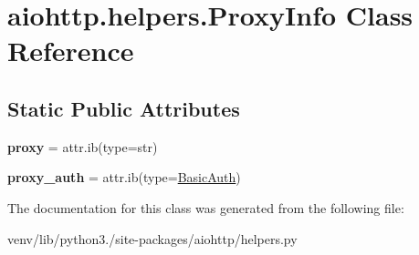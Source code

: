 \hypertarget{classaiohttp_1_1helpers_1_1_proxy_info}{}\section{aiohttp.\+helpers.\+Proxy\+Info Class Reference}
\label{classaiohttp_1_1helpers_1_1_proxy_info}
\subsection*{Static Public Attributes}
\begin{DoxyCompactItemize}
\item 
\mbox{\label{classaiohttp_1_1helpers_1_1_proxy_info_ae1f89621b3c1b9747d39d44e1eb41153}} 
{\bfseries proxy} = attr.\+ib(type=str)
\item 
\mbox{\label{classaiohttp_1_1helpers_1_1_proxy_info_aec5ce50f03980f741272d1c1c82dc211}} 
{\bfseries proxy\+\_\+auth} = attr.\+ib(type=\hyperlink{classaiohttp_1_1helpers_1_1_basic_auth}{Basic\+Auth})
\end{DoxyCompactItemize}


The documentation for this class was generated from the following file\+:\begin{DoxyCompactItemize}
\item 
venv/lib/python3./site-\/packages/aiohttp/helpers.\+py\end{DoxyCompactItemize}
